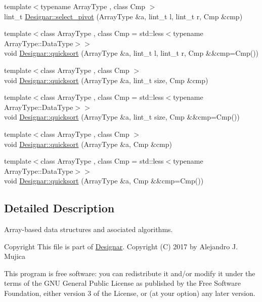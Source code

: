 \begin{DoxyCompactItemize}
\item 
{\footnotesize template$<$typename Array\+Type , class Cmp $>$ }\\lint\+\_\+t \hyperlink{namespace_designar_ac3674dae50d8d382e25a5fce8775294c}{Designar\+::select\+\_\+pivot} (Array\+Type \&a, lint\+\_\+t l, lint\+\_\+t r, Cmp \&cmp)
\item 
{\footnotesize template$<$class Array\+Type , class Cmp  = std\+::less$<$typename Array\+Type\+::\+Data\+Type$>$$>$ }\\void \hyperlink{namespace_designar_af359499060a9d2b8e282ae9def049e17}{Designar\+::quicksort} (Array\+Type \&a, lint\+\_\+t l, lint\+\_\+t r, Cmp \&\&cmp=Cmp())
\item 
{\footnotesize template$<$class Array\+Type , class Cmp $>$ }\\void \hyperlink{namespace_designar_a4887d9486cdfcd7e021047915ae26651}{Designar\+::quicksort} (Array\+Type \&a, lint\+\_\+t size, Cmp \&cmp)
\item 
{\footnotesize template$<$class Array\+Type , class Cmp  = std\+::less$<$typename Array\+Type\+::\+Data\+Type$>$$>$ }\\void \hyperlink{namespace_designar_a3b84da2b14868b20993ec9687e3c29c4}{Designar\+::quicksort} (Array\+Type \&a, lint\+\_\+t size, Cmp \&\&cmp=Cmp())
\item 
{\footnotesize template$<$class Array\+Type , class Cmp $>$ }\\void \hyperlink{namespace_designar_ae6156420cc82f38302cc7b7c837275b1}{Designar\+::quicksort} (Array\+Type \&a, Cmp \&cmp)
\item 
{\footnotesize template$<$class Array\+Type , class Cmp  = std\+::less$<$typename Array\+Type\+::\+Data\+Type$>$$>$ }\\void \hyperlink{namespace_designar_a75b9270f723888eb32e0b8f78032f0df}{Designar\+::quicksort} (Array\+Type \&a, Cmp \&\&cmp=Cmp())
\end{DoxyCompactItemize}


\subsection{Detailed Description}
Array-\/based data structures and asociated algorithms. 

\begin{DoxyCopyright}{Copyright}
This file is part of \hyperlink{namespace_designar}{Designar}. Copyright (C) 2017 by Alejandro J. Mujica
\end{DoxyCopyright}
This program is free software\+: you can redistribute it and/or modify it under the terms of the G\+NU General Public License as published by the Free Software Foundation, either version 3 of the License, or (at your option) any later version.

